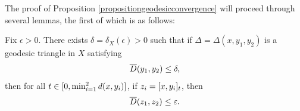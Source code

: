 %
%

The proof of Proposition \ref{propositiongeodesicconvergence} will proceed through several lemmas, the first of which is as follows:

\begin{lemma}
\label{lemmaxyz}
Fix $\epsilon > 0$. There exists $\delta = \delta_X(\epsilon) > 0$ such that if $\Delta = \Delta(x,y_1,y_2)$ is a geodesic triangle in $X$ satisfying
\begin{equation}
\label{y1y2delta}
\overline{D}(y_1,y_2) \leq \delta,
\end{equation}
then for all $t\in[0,\min_{i = 1}^2 d(x,y_i)]$, if $z_i = [x,y_i]_t$, then
\begin{equation}
\label{z1z2epsilon}
\overline{D}(z_1,z_2) \leq \varepsilon.
\end{equation}
\end{lemma}
